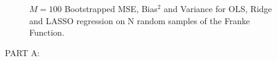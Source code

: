 \documentclass[reprint, english, nofootinbib]{revtex4-2}
\begin{document}
\begin{figure}
{         }
         \caption{$M = 100$ Bootstrapped MSE, Bias$^2$ and Variance for OLS, Ridge and LASSO regression on N random samples of the Franke Function.}
         \label{contour plots}
    \end{figure}



PART A:
\end{document}
